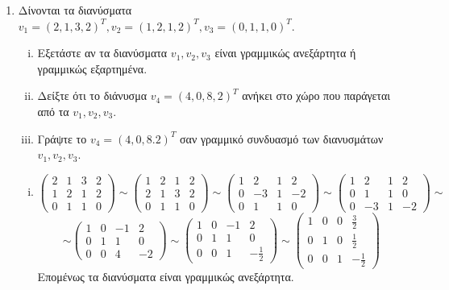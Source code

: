 \pagebreak

\begin{center}
\end{center}

\vspace{\baselineskip}

\begin{enumerate}[1.]
\item Δίνονται τα διανύσματα $v_1=(2,1,3,2)^T, v_2=(1,2,1,2)^T, v_3=(0,1,1,0)^T$.
\begin{enumerate}[i)]
\item Εξετάστε αν τα διανύσματα $v_1,v_2,v_3$ είναι γραμμικώς ανεξάρτητα ή γραμμικώς εξαρτημένα.
\item Δείξτε ότι το διάνυσμα $v_4=(4,0,8,2)^T$ ανήκει στο χώρο που παράγεται από τα $v_1,v_2,v_3$.
\item Γράψτε το $v_4=(4,0,8.2)^T$ σαν γραμμικό συνδυασμό των διανυσμάτων $v_1,v_2,v_3$.
\end{enumerate}

\vspace{\baselineskip}


\vspace{\baselineskip}

\begin{enumerate}[i)]
\item \[
\begin{pmatrix}
2 & 1 & 3 & 2 \\
1 & 2 & 1 & 2 \\
0 & 1 & 1 & 0
\end{pmatrix}
\sim
\begin{pmatrix}
1 & 2 & 1 & 2 \\
2 & 1 & 3 & 2 \\
0 & 1 & 1 & 0 
\end{pmatrix}
\sim
\begin{pmatrix}
1 & 2 & 1 & 2 \\
0 & -3 & 1 & -2 \\
0 & 1 & 1 & 0
\end{pmatrix}
\sim
\begin{pmatrix}
1 & 2 & 1 & 2 \\
0 & 1 & 1 & 0 \\
0 & -3 & 1 & -2
\end{pmatrix}
\sim
\]
\[
\sim
\begin{pmatrix}
1 & 0 & -1 & 2 \\
0 & 1 & 1 & 0 \\
0 & 0 & 4 & -2
\end{pmatrix}
\sim
\begin{pmatrix}
1 & 0 & -1 & 2 \\
0 & 1 & 1 & 0 \\
0 & 0 & 1 & -\frac{1}{2}
\end{pmatrix}
\sim
\begin{pmatrix}
1 & 0 & 0 & \frac{3}{2} \\
0 & 1 & 0 & \frac{1}{2} \\
0 & 0 & 1 & -\frac{1}{2}
\end{pmatrix}
\]
Επομένως τα διανύσματα είναι γραμμικώς ανεξάρτητα.


\end{enumerate}
\end{enumerate}

